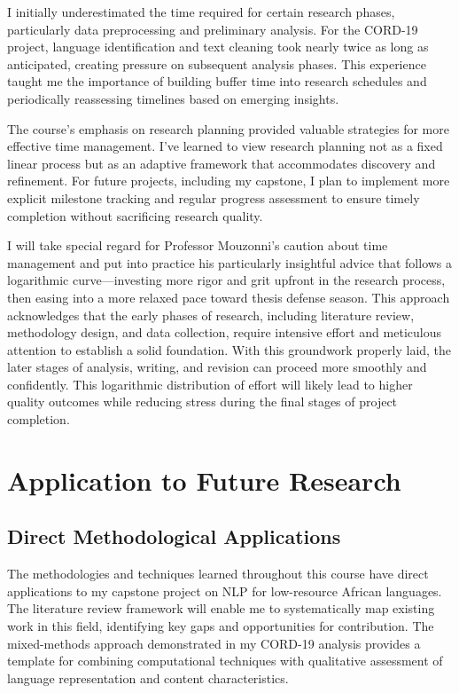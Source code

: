 \documentclass[
]{article}
\begin{document}
I initially underestimated the time required for certain research
phases, particularly data preprocessing and preliminary analysis. For
the CORD-19 project, language identification and text cleaning took
nearly twice as long as anticipated, creating pressure on subsequent
analysis phases. This experience taught me the importance of building
buffer time into research schedules and periodically reassessing
timelines based on emerging insights.

The course's emphasis on research planning provided valuable strategies
for more effective time management. I've learned to view research
planning not as a fixed linear process but as an adaptive framework that
accommodates discovery and refinement. For future projects, including my
capstone, I plan to implement more explicit milestone tracking and
regular progress assessment to ensure timely completion without
sacrificing research quality.

I will take special regard for Professor Mouzonni's caution about time
management and put into practice his particularly insightful advice that
follows a logarithmic curve---investing more rigor and grit upfront in
the research process, then easing into a more relaxed pace toward thesis
defense season. This approach acknowledges that the early phases of
research, including literature review, methodology design, and data
collection, require intensive effort and meticulous attention to
establish a solid foundation. With this groundwork properly laid, the
later stages of analysis, writing, and revision can proceed more
smoothly and confidently. This logarithmic distribution of effort will
likely lead to higher quality outcomes while reducing stress during the
final stages of project completion.

\section{Application to Future
Research}\label{application-to-future-research}

\subsection{Direct Methodological
Applications}\label{direct-methodological-applications}

The methodologies and techniques learned throughout this course have
direct applications to my capstone project on NLP for low-resource
African languages. The literature review framework will enable me to
systematically map existing work in this field, identifying key gaps and
opportunities for contribution. The mixed-methods approach demonstrated
in my CORD-19 analysis provides a template for combining computational
techniques with qualitative assessment of language representation and
content characteristics.
\end{document}
